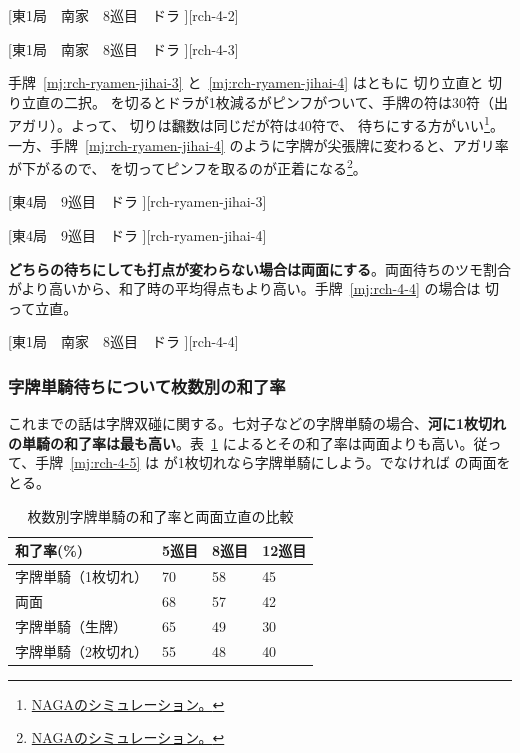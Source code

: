 \documentclass[../nankiru_main.tex]{subfiles}
\begin{document}
[東1局　南家　8巡目　ドラ ][rch-4-2]

[東1局　南家　8巡目　ドラ ][rch-4-3]

手牌~\ref{mj:rch-ryamen-jihai-3} と~\ref{mj:rch-ryamen-jihai-4} はともに  切り立直と  切り立直の二択。 を切るとドラが1枚減るがピンフがついて、手牌の符は30符（出アガリ）。よって、 切りは飜数は同じだが符は40符で、 待ちにする方がいい\footnote{\href{https://naga.dmv.nico/htmls/6f2da675938820c4e4e2aee73aab7b00f5fbf728fc223db932733307ff96c684v2_2.html?tw=0}{NAGAのシミュレーション。}}。一方、手牌~\ref{mj:rch-ryamen-jihai-4} のように字牌が尖張牌に変わると、アガリ率が下がるので、 を切ってピンフを取るのが正着になる\footnote{\href{https://naga.dmv.nico/htmls/8620eb82ba4651e70db2a67cd4baaa108b1481600f5fa8582d33c726931b0e37v2_2.html?tw=0}{NAGAのシミュレーション。}}。

[東4局　9巡目　ドラ ][rch-ryamen-jihai-3]

[東4局　9巡目　ドラ ][rch-ryamen-jihai-4]

\textbf{どちらの待ちにしても打点が変わらない場合は両面にする}\citep[][p. 52]{miinin-stat}。両面待ちのツモ割合がより高いから、和了時の平均得点もより高い。手牌~\ref{mj:rch-4-4} の場合は  切って立直。

[東1局　南家　8巡目　ドラ ][rch-4-4] 


\subsubsection*{字牌単騎待ちについて枚数別の和了率} 

これまでの話は字牌双碰に関する。七対子などの字牌単騎の場合、\textbf{河に1枚切れの単騎の和了率は最も高い}\citep[][p. 64]{miinin-stat}。表~\ref{tab:winrate-jihai-tanki} によるとその和了率は両面よりも高い。従って、手牌~\ref{mj:rch-4-5} は  が1枚切れなら字牌単騎にしよう。でなければ  の両面をとる。

\begin{table}[ht]
  \centering
  \begin{tabular}{llll}
    和了率(\%) & 5巡目 & 8巡目 & 12巡目 \\
    \hline
    字牌単騎（1枚切れ） & 70 & 58 & 45 \\
    両面             & 68 & 57 & 42 \\
    字牌単騎（生牌）   & 65 & 49 & 30 \\
    字牌単騎（2枚切れ）& 55 & 48 & 40
  \end{tabular}
  \caption{枚数別字牌単騎の和了率と両面立直の比較}
  \label{tab:winrate-jihai-tanki}
\end{table}
\end{document}
